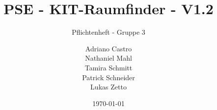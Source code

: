 \title{
    PSE - KIT-Raumfinder - V1.2
}
\subtitle{Pflichtenheft - Gruppe 3}
\author{
    Adriano Castro \\
    Nathaniel Mahl \\
    Tamira Schmitt \\
    Patrick Schneider \\
    Lukas Zetto
}

\date{\today}

\maketitle